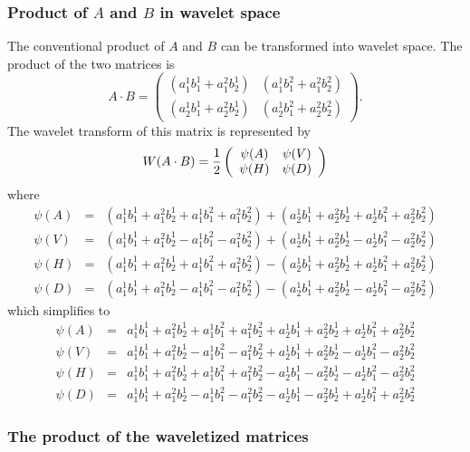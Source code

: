 \subsubsection{Product of $A$ and $B$ in wavelet space}

The conventional product of $A$ and $B$ can be transformed into wavelet space.  The product of the two matrices is
\[
A \cdot B = 
\left(\begin{array}{cc} 
\left(a^1_1b^1_1 + a^2_1 b^1_2 \right) &  
\left(a^1_1b^2_1 + a^2_1 b^2_2 \right) \\ 
\left(a^1_2 b^1_1 + a^2_2 b^1_2\right) &  
\left(a^1_2 b^2_1 + a^2_2 b^2_2\right) 
\end{array}\right)   .
\]
The wavelet transform of this matrix is represented by 
\[
W(A \cdot B) =
{1 \over 2}
\left(
\begin{array}{cc}
\psi(A) & \psi(V) \\
\psi(H) & \psi(D)
\end{array}
\right)
\]
where 
\begin{eqnarray*}
\psi(A) &=& (a^1_1 b^1_1 + a^2_1 b^1_2 + a^1_1b^2_1 + a^2_1  b^2_2) + (a^1_2 b^1_1 + a^2_2 b^1_2 + a^1_2 b^2_1 + a^2_2 b^2_2)\\
\psi(V) &=&(a^1_1 b^1_1 + a^2_1 b^1_2  - a^1_1b^2_1 - a^2_1  b^2_2) +  (a^1_2 b^1_1 + a^2_2 b^1_2 - a^1_2 b^2_1 - a^2_2 b^2_2 ) \\
\psi(H) &=& (a^1_1 b^1_1 + a^2_1 b^1_2 + a^1_1b^2_1 + a^2_1  b^2_2) - (a^1_2 b^1_1 + a^2_2 b^1_2 + a^1_2 b^2_1 + a^2_2 b^2_2)\\
\psi(D) &=& (a^1_1 b^1_1 + a^2_1 b^1_2  - a^1_1b^2_1 - a^2_1  b^2_2) - (a^1_2 b^1_1 + a^2_2 b^1_2 - a^1_2 b^2_1 - a^2_2 b^2_2 )
\end{eqnarray*}
which simplifies to 
\begin{eqnarray*}
\psi(A) &=& a^1_1 b^1_1 + a^2_1 b^1_2 + a^1_1b^2_1 + a^2_1  b^2_2 + a^1_2 b^1_1 + a^2_2 b^1_2 + a^1_2 b^2_1 + a^2_2 b^2_2 \\
\psi(V) &=& a^1_1 b^1_1 + a^2_1 b^1_2  - a^1_1b^2_1 - a^2_1  b^2_2 +  a^1_2 b^1_1 + a^2_2 b^1_2 - a^1_2 b^2_1 - a^2_2 b^2_2 \\
\psi(H) &=& a^1_1 b^1_1 + a^2_1 b^1_2 + a^1_1b^2_1 + a^2_1  b^2_2 - a^1_2 b^1_1 - a^2_2 b^1_2 - a^1_2 b^2_1 - a^2_2 b^2_2 \\
\psi(D) &=& a^1_1 b^1_1 + a^2_1 b^1_2  - a^1_1b^2_1 - a^2_1  b^2_2 -a^1_2 b^1_1 - a^2_2 b^1_2 + a^1_2 b^2_1 + a^2_2 b^2_2  
\end{eqnarray*}

\subsubsection{The product of the waveletized matrices}

